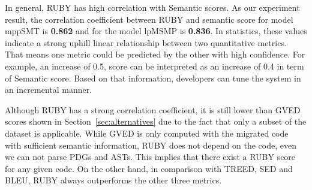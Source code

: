 In general, RUBY has high correlation with Semantic scores. As our
experiment result, the correlation coefficient between RUBY and
semantic score for model mppSMT is \textbf{0.862} and for the model
lpMSMP is \textbf{0.836}. In statistics, these values indicate a
strong uphill linear relationship between two quantitative
metrics. That means one metric could be predicted by the other with
high confidence. For example, an increase of 0.5, {\model} score can
be interpreted as an increase of 0.4 in term of Semantic score. Based
on that information, developers can tune the system in an incremental
manner.



Although RUBY has a strong correlation coefficient, it is still lower
than GVED scores shown in Section~\ref{sec:alternatives} due to the
fact that only a subset of the dataset is applicable. While GVED is
only computed with the migrated code with sufficient semantic
information, RUBY does not depend on the code, even we can not parse
PDGs and ASTs. This implies that there exist a RUBY score for any
given code. On the other hand, in comparison with TREED, SED
and BLEU, RUBY always outperforms the other three metrics.
	    
  			
